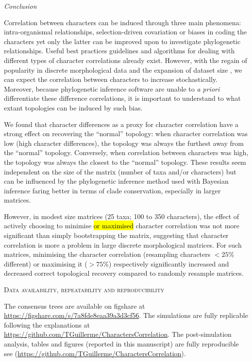 \documentclass[12pt,letterpaper]{article}
\renewcommand{\section}[1]{%
\bigskip
\begin{center}
\begin{Large}
\normalfont\scshape #1
\medskip
\end{Large}
\end{center}}
\renewcommand{\subsection}[1]{%
\bigskip
\begin{center}
\begin{large}
\normalfont\itshape #1
\end{large}
\end{center}}
\begin{document}
\subsection{Conclusion}
Correlation between characters can be induced through three main phenomena: intra-organismal relationships, selection-driven covariation or biases in coding the characters yet only the latter can be improved upon to investigate phylogenetic relationships.
Useful best practices guidelines \citep[e.g.][]{Brazeau2011,simoes2017giant} and algorithms for dealing with different types of character correlations \citep[e.g. for characters hierarchy][]{de2015parsimony,BrazeauNA} already exist.
However, with the regain of popularity in discrete morphological data and the expansion of dataset size \citep[e.g.][with more than 1000 characters each]{nithe2013,O'Leary08022013}, we can expect the correlation between characters to increase stochastically.
Moreover, because phylogenetic inference software are unable to \textit{a priori} differentiate these difference correlations, it is important to understand to what extant topologies can be induced by such bias.

We found that character differences as a proxy for character correlation have a strong effect on recovering the ``normal'' topology: when character correlation was low (high character differences), the topology was always the furthest away from the ``normal'' topology.
Conversely, when correlation between characters was high, the topology was always the closest to the ``normal'' topology.
These results seem independent on the size of the matrix (number of taxa and/or characters) but can be influenced by the phylogenetic inference method used with Bayesian inference faring better in terms of clade conservation, especially in larger matrices.

However, in modest size matrices (25 taxa; 100 to 350 characters), the effect of actively choosing to minimise \hl{or maximised} character correlation was not more significant than simply bootstrapping the matrix, suggesting that character correlation is more a problem in large discrete morphological matrices.
For such matrices, minimising the character correlation (resampling characters $<25$\% different) or maximising it ($>75$\%) respectively significantly increased and decreased correct topological recovery compared to randomly resample matrices.


\section{Data availability, repeatability and reproducibility}
The consensus trees are available on figshare at \url{https://figshare.com/s/7a8fde8eaa39a3d3cf56}.
The simulations are fully replicable following the explanations at \url{https://github.com/TGuillerme/CharactersCorrelation}.
The post-simulation analysis, tables and figures (reported in this manuscript) are fully reproducible see (\url{https://github.com/TGuillerme/CharactersCorrelation}).
\end{document}
